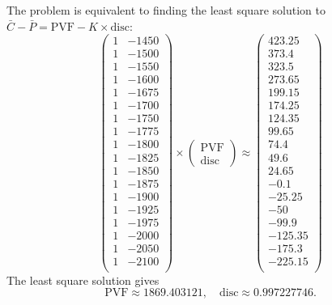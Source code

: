 \documentclass[paper=a4, fontsize=11pt]{scrartcl} %
\numberwithin{equation}{section} %
\numberwithin{figure}{section} %
\numberwithin{table}{section} %
\begin{document}
The problem is equivalent to finding the least square solution to $\bar{C} - \bar{P} = \text{PVF} - K\times \text{disc}$:
$$
\begin{pmatrix}
1& -1450 \\
1& -1500 \\
1& -1550 \\
1& -1600 \\
1& -1675 \\
1& -1700 \\
1& -1750 \\
1& -1775 \\
1& -1800 \\
1& -1825 \\
1& -1850 \\
1& -1875 \\
1& -1900 \\
1& -1925 \\
1& -1975 \\
1& -2000 \\
1& -2050 \\
1& -2100 \\
\end{pmatrix}
\times
\begin{pmatrix}
\text{PVF} \\
\text{disc}
\end{pmatrix}
\approx
\begin{pmatrix}
423.25 \\
373.4 \\
323.5 \\
273.65 \\
199.15 \\
174.25 \\
124.35 \\
99.65 \\
74.4 \\
49.6 \\
24.65 \\
-0.1 \\
-25.25 \\
-50 \\
-99.9 \\
-125.35 \\
-175.3 \\
-225.15 \\
\end{pmatrix}
$$
The least square solution gives
$$
\text{PVF} \approx 1869.403121, \quad \text{disc} \approx 0.997227746.
$$
\end{document}
